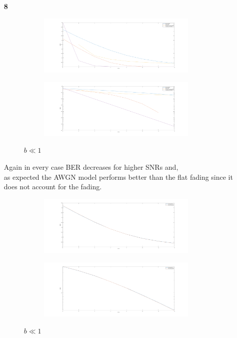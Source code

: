 \documentclass[12pt]{article}
\begin{document}
\begin{enumerate}
		\newpage
		\item[\bf 8]
		\begin{figure}
			\centering
			\begin{subfigure}[b]{\textwidth}
				\centering
				\includegraphics[width=0.9\textwidth]{fig5.png}
			\end{subfigure}
			\begin{subfigure}[b]{\textwidth}
				\centering
				\includegraphics[width=0.9\textwidth]{fig5_b.png}
			\end{subfigure}
			\caption{$b\ll 1$}
		\end{figure}
		Again in every case BER decreases for higher SNRs and,\\
		as expected the AWGN model performs better than the flat fading since it does not account for the fading. 
		
		\newpage
		\begin{figure}[h!]
			\centering
			\begin{subfigure}[b]{0.8\textwidth}
				\centering
				\includegraphics[width=0.9\textwidth]{fig6.png}
			\end{subfigure}
			\begin{subfigure}[b]{0.8\textwidth}
				\centering
				\includegraphics[width=0.9\textwidth]{fig7.png}
			\end{subfigure}
			\caption{$b\ll 1$}
		\end{figure}
	

\end{enumerate}
\end{document}
